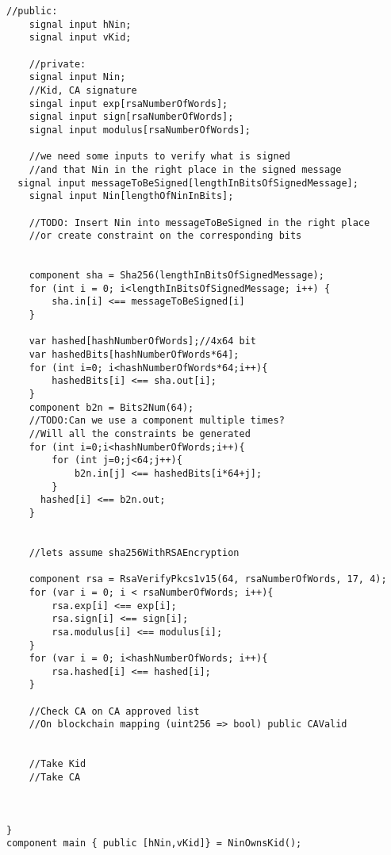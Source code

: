 \documentclass{article}
\begin{document}
\begin{enumerate}[leftmargin=0cm]
\begin{minipage}{\dimexpr\textwidth-20px}
\begin{lstlisting}[language=circom]
	//public:
	signal input hNin;
	signal input vKid;

	//private:
	signal input Nin;
	//Kid, CA signature
	singal input exp[rsaNumberOfWords];
	signal input sign[rsaNumberOfWords];
	signal input modulus[rsaNumberOfWords];

	//we need some inputs to verify what is signed
	//and that Nin in the right place in the signed message
  signal input messageToBeSigned[lengthInBitsOfSignedMessage];
	signal input Nin[lengthOfNinInBits];

	//TODO: Insert Nin into messageToBeSigned in the right place
	//or create constraint on the corresponding bits


	component sha = Sha256(lengthInBitsOfSignedMessage);
	for (int i = 0; i<lengthInBitsOfSignedMessage; i++) {
		sha.in[i] <== messageToBeSigned[i]
	}

	var hashed[hashNumberOfWords];//4x64 bit
	var hashedBits[hashNumberOfWords*64];
	for (int i=0; i<hashNumberOfWords*64;i++){
		hashedBits[i] <== sha.out[i];
	}
	component b2n = Bits2Num(64);
	//TODO:Can we use a component multiple times?
	//Will all the constraints be generated
	for (int i=0;i<hashNumberOfWords;i++){
		for (int j=0;j<64;j++){
			b2n.in[j] <== hashedBits[i*64+j];
		}
	  hashed[i] <== b2n.out;
	}

	
	//lets assume sha256WithRSAEncryption

	component rsa = RsaVerifyPkcs1v15(64, rsaNumberOfWords, 17, 4);
	for (var i = 0; i < rsaNumberOfWords; i++){
		rsa.exp[i] <== exp[i];
		rsa.sign[i] <== sign[i];
		rsa.modulus[i] <== modulus[i];
	}
	for (var i = 0; i<hashNumberOfWords; i++){
		rsa.hashed[i] <== hashed[i];
	}

	//Check CA on CA approved list
	//On blockchain mapping (uint256 => bool) public CAValid

	
	//Take Kid
	//Take CA

	
	
}
component main { public [hNin,vKid]} = NinOwnsKid();
\end{lstlisting}
\xdef\tpd{\the\prevdepth}
\end{minipage}


\end{enumerate}
\end{document}
